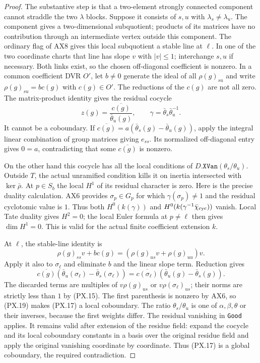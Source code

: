 \begin{proof}
The substantive step is that a two-element
strongly connected component cannot straddle
the two $\lambda$ blocks.  Suppose it consists
of $s,u$ with $\lambda_s\ne\lambda_u$.
The component gives a two-dimensional
subquotient; products of its matrices have no
contribution through an intermediate vertex
outside this component.  The ordinary flag
of AX8 gives this local subquotient a stable
line at $\ell$.  In one of the two coordinate
charts that line has slope $v$ with $|v|\le1$;
interchange $s,u$ if necessary.  Both links
exist, so the chosen off-diagonal coefficient
is nonzero.  In a common coefficient DVR
$O'$, let $b\ne0$ generate the ideal of all
$\rho(g)_{su}$ and write
$\rho(g)_{su}=b c(g)$ with $c(g)\in O'$.
The reductions of the $c(g)$ are not all zero.
The matrix-product identity gives the residual
cocycle
\[
 z(g)=\frac{\overline{c(g)}}{\bar\theta_u(g)},
 \qquad \gamma=\bar\theta_s\bar\theta_u^{-1}.
 \tag{PX.17}
\]
It cannot be a coboundary.  If
$\overline{c(g)}=a(\bar\theta_s(g)-\bar\theta_u(g))$,
apply the integral linear combination of group
matrices giving $e_{ss}$.  Its normalized
off-diagonal entry gives $0=a$, contradicting
that some $\overline{c(g)}$ is nonzero.

On the other hand this cocycle has all the
local conditions of $D.\mathtt{XVan}(\theta_s/\theta_u)$.
Outside $T$, the actual unramified condition
kills it on inertia intersected with
$\ker\bar\rho$.  At $p\in S_b$ the local
$H^1$ of its residual character is zero.
Here is the precise duality calculation.
AX6 provides $\sigma_p\in G_p$ for which
$\gamma(\sigma_p)\ne1$ and the residual
cyclotomic value is $1$.  Thus both $H^0(k(\gamma))$
and $H^0(k(\gamma^{-1}\bar\chi_{\rm cyc}))$
vanish.  Local Tate duality gives $H^2=0$;
the local Euler formula at $p\ne\ell$ then
gives $\dim H^1=0$.  This is valid for
the actual finite coefficient extension $k$.

At $\ell$, the stable-line identity is
\[
 \rho(g)_{ss}v+b c(g)
             =(\rho(g)_{us}v+\rho(g)_{uu})v.
 \tag{PX.18}
\]
Apply it also to $\sigma_\ell$ and eliminate
$b$ and the linear slope term.  Reduction
gives
\[
 \overline{c(g)}(\bar\theta_u(\sigma_\ell)
                      -\bar\theta_s(\sigma_\ell))
 =\overline{c(\sigma_\ell)}
                     (\bar\theta_u(g)-\bar\theta_s(g)).
 \tag{PX.19}
\]
The discarded terms are multiples of
$v\rho(g)_{us}$ or $v\rho(\sigma_\ell)_{us}$;
their norms are strictly less than $1$ by
(PX.15).  The first parenthesis is nonzero
by AX6, so (PX.19) makes (PX.17) a local
coboundary.  The ratio $\theta_s/\theta_u$
is one of $\alpha,\beta,\theta$ or their
inverses, because the first weights differ.
The residual vanishing in \texttt{Good}
applies.  It remains valid after extension
of the residue field: expand the cocycle
and its local coboundary constants in a
basis over the original residue field and
apply the original vanishing coordinate by
coordinate.  Thus (PX.17) is a global
coboundary, the required contradiction.


\end{proof}
